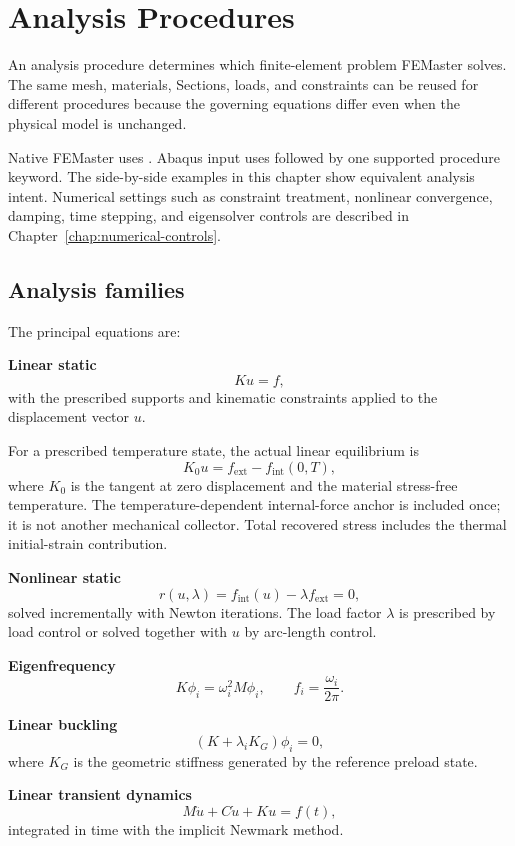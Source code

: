 \chapter{Analysis Procedures}
\label{chap:analysis-procedures}

An analysis procedure determines which finite-element problem FEMaster solves. The same mesh, materials, Sections, loads, and constraints can be reused for different procedures because the governing equations differ even when the physical model is unchanged.

Native FEMaster uses . Abaqus input uses  followed by one supported procedure keyword. The side-by-side examples in this chapter show equivalent analysis intent. Numerical settings such as constraint treatment, nonlinear convergence, damping, time stepping, and eigensolver controls are described in Chapter~\ref{chap:numerical-controls}.

\section{Analysis families}

The principal equations are:

\textbf{Linear static}
\[
K u=f,
\]
with the prescribed supports and kinematic constraints applied to the displacement vector \(u\).

For a prescribed temperature state, the actual linear equilibrium is
\[
K_0u=f_{\mathrm{ext}}-f_{\mathrm{int}}(0,T),
\]
where \(K_0\) is the tangent at zero displacement and the material stress-free temperature. The temperature-dependent internal-force anchor is included once; it is not another mechanical collector. Total recovered stress includes the thermal initial-strain contribution.

\textbf{Nonlinear static}
\[
r(u,\lambda)=f_\mathrm{int}(u)-\lambda f_\mathrm{ext}=0,
\]
solved incrementally with Newton iterations. The load factor \(\lambda\) is prescribed by load control or solved together with \(u\) by arc-length control.

\textbf{Eigenfrequency}
\[
K\phi_i=\omega_i^2 M\phi_i,
\qquad
f_i=\frac{\omega_i}{2\pi}.
\]

\textbf{Linear buckling}
\[
\left(K+\lambda_i K_G\right)\phi_i=0,
\]
where \(K_G\) is the geometric stiffness generated by the reference preload state.

\textbf{Linear transient dynamics}
\[
M\ddot u+C\dot u+Ku=f(t),
\]
integrated in time with the implicit Newmark method.

